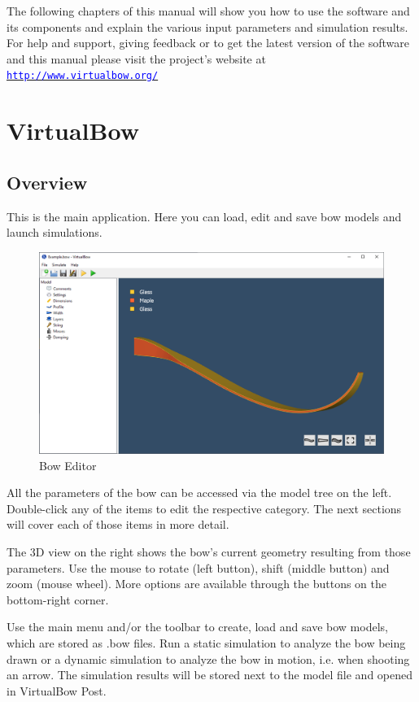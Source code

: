 \documentclass[12pt]{article}
\newcommand{\website}{\href{http://www.virtualbow.org/}{\texttt{\textcolor{blue}{http://www.virtualbow.org/}}}}
\begin{document}
\bigskip

The following chapters of this manual will show you how to use the software and its components and explain the various input parameters and simulation results. For help and support, giving feedback or to get the latest version of the software and this manual please visit the project's website at \website

\newpage
\section{VirtualBow}

\subsection{Overview}

This is the main application.
Here you can load, edit and save bow models and launch simulations.

\begin{figure}[H]
\centering
\includegraphics[width=\textwidth]{figures/screenshots/input/bow-editor}
\caption{Bow Editor}
\label{fig:bow-editor}
\end{figure}

All the parameters of the bow can be accessed via the model tree on the left.
Double-click any of the items to edit the respective category.
The next sections will cover each of those items in more detail.

The 3D view on the right shows the bow's current geometry resulting from those parameters.
Use the mouse to rotate (left button), shift (middle button) and zoom (mouse wheel).
More options are available through the buttons on the bottom-right corner.

Use the main menu and/or the toolbar to create, load and save bow models, which are stored as .bow files.
Run a static simulation to analyze the bow being drawn or a dynamic simulation to analyze the bow in motion, i.e. when shooting an arrow.
The simulation results will be stored next to the model file and opened in VirtualBow Post.
\end{document}
